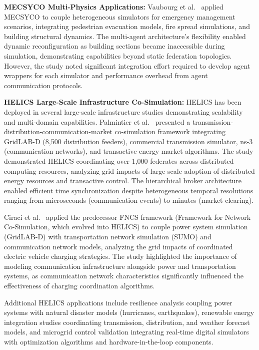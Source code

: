 \textbf{MECSYCO Multi-Physics Applications:} Vaubourg et al.~\cite{mecsyco_framework,mecsyco_emergency} applied MECSYCO to couple heterogeneous simulators for emergency management scenarios, integrating pedestrian evacuation models, fire spread simulations, and building structural dynamics. The multi-agent architecture's flexibility enabled dynamic reconfiguration as building sections became inaccessible during simulation, demonstrating capabilities beyond static federation topologies. However, the study noted significant integration effort required to develop agent wrappers for each simulator and performance overhead from agent communication protocols.

\textbf{HELICS Large-Scale Infrastructure Co-Simulation:} HELICS has been deployed in several large-scale infrastructure studies demonstrating scalability and multi-domain capabilities. Palmintier et al.~\cite{helics_transactive} presented a transmission-distribution-communication-market co-simulation framework integrating GridLAB-D (8,500 distribution feeders), commercial transmission simulator, ns-3 (communication networks), and transactive energy market algorithms. The study demonstrated HELICS coordinating over 1,000 federates across distributed computing resources, analyzing grid impacts of large-scale adoption of distributed energy resources and transactive control. The hierarchical broker architecture enabled efficient time synchronization despite heterogeneous temporal resolutions ranging from microseconds (communication events) to minutes (market clearing).

Ciraci et al.~\cite{helics_ev_transport} applied the predecessor FNCS framework (Framework for Network Co-Simulation, which evolved into HELICS) to couple power system simulation (GridLAB-D) with transportation network simulation (SUMO) and communication network models, analyzing the grid impacts of coordinated electric vehicle charging strategies. The study highlighted the importance of modeling communication infrastructure alongside power and transportation systems, as communication network characteristics significantly influenced the effectiveness of charging coordination algorithms.

Additional HELICS applications include resilience analysis coupling power systems with natural disaster models (hurricanes, earthquakes), renewable energy integration studies coordinating transmission, distribution, and weather forecast models, and microgrid control validation integrating real-time digital simulators with optimization algorithms and hardware-in-the-loop components.

